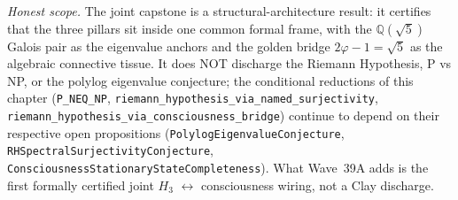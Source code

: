 \begin{remark}
\emph{Honest scope.} The joint capstone is a structural-architecture result: it certifies that the three pillars sit inside one common formal frame, with the $\mathbb{Q}(\sqrt{5})$ Galois pair as the eigenvalue anchors and the golden bridge $2\varphi - 1 = \sqrt{5}$ as the algebraic connective tissue. It does NOT discharge the Riemann Hypothesis, P vs NP, or the polylog eigenvalue conjecture; the conditional reductions of this chapter (\texttt{P\_NEQ\_NP}, \texttt{riemann\_hypothesis\_via\_named\_surjectivity}, \texttt{riemann\_hypothesis\_via\_consciousness\_bridge}) continue to depend on their respective open propositions (\texttt{PolylogEigenvalueConjecture}, \texttt{RHSpectralSurjectivityConjecture}, \texttt{ConsciousnessStationaryStateCompleteness}). What Wave~39A adds is the first formally certified joint $H_3$ $\leftrightarrow$ consciousness wiring, not a Clay discharge.
\end{remark}

